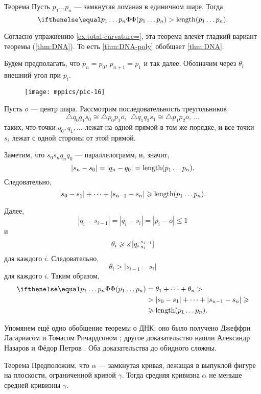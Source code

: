 \begin{thm}{Теорема}\label{thm:DNA-poly}
Пусть $p_1\dots p_n$ --- замкнутая ломаная в единичном шаре.
Тогда 
\[\tc{p_1\dots p_n}>\length(p_1\dots p_n).\]
\end{thm}

Согласно упражнению \ref{ex:total-curvature=}, эта теорема влечёт гладкий вариант теоремы (\ref{thm:DNA}).
То есть \ref{thm:DNA-poly} обобщает \ref{thm:DNA}.

Будем предполагать, что $p_n=p_0$, $p_{n+1}=p_1$ и так далее.
Обозначим через $\theta_i$ внешний угол при $p_i$.

\begin{figure}[ht!]
\vskip-0mm
\centering
\texttt{[image: mppics/pic-16]}
\vskip0mm
\end{figure}

Пусть $o$ --- центр шара.
Рассмотрим последовательность треугольников 
\[\triangle q_0q_1s_0\cong \triangle p_0p_1o,\ \ \triangle q_1q_2s_1\cong \triangle p_1p_2o,\ \dots\]
таких, что точки $q_0,q_1,\dots$ лежат на одной прямой в том же порядке, и все точки $s_i$ лежат с одной стороны от этой прямой.

Заметим, что $s_0s_nq_nq_0$ --- параллелограмм, и, значит,
\[|s_n-s_0|=|q_n-q_0|=\mathop{\rm length}\nolimits (p_1\dots p_n).\]
Следовательно, 
\[|s_0-s_1|+\dots+|s_{n-1}-s_n|\geqslant \mathop{\rm length}\nolimits (p_1\dots p_n).\]

Далее, 
\[|q_i-s_{i-1}|=|q_i-s_i|=|p_i-o|\le 1\]
и
\[\theta_i\geqslant\measuredangle [q_i\,{}^{s_{i-1}}_{s_i}]\]
для каждого $i$.
Следовательно,
\[\theta_i>|s_{i-1}-s_i|\]
для каждого $i$.
Таким образом,
\begin{align*}
\tc {p_1\dots p_n}
&=\theta_1+\dots+\theta_n>
\\
&> |s_{0}-s_1|+\dots +|s_{n-1}-s_n|\ge 
\\
&\ge\length (p_1\dots p_n).
\end{align*}
\qedsf

Упомянем ещё одно обобщение теоремы о ДНК;
оно было получено Джеффри Лагариасом и Томасом Ричардсоном \cite{lagarias-richardso}; другое доказательство нашли Александр Назаров и Фёдор Петров \cite{nazarov-petrov}.
Оба доказательства до обидного сложны.

\begin{thm}{Теорема}
Предположим, что $\alpha$ --- замкнутая кривая, лежащая в выпуклой фигуре на плоскости, ограниченной кривой $\gamma$.
Тогда средняя кривизна $\alpha$ не меньше средней кривизны $\gamma$.

\end{thm}

